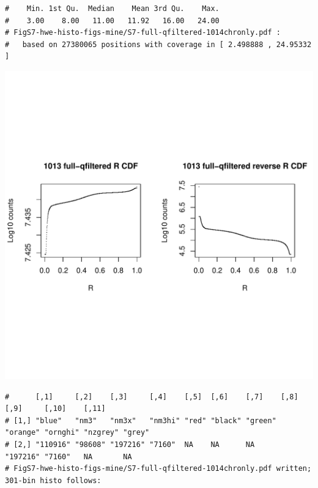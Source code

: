 \documentclass{article}\usepackage[]{graphicx}\usepackage[]{color}
\makeatletter
\def\maxwidth{ %
  \ifdim\Gin@nat@width>\linewidth
    \linewidth
  \else
    \Gin@nat@width
  \fi
}
\newenvironment{kframe}{%
 \def\at@end@of@kframe{}%
 \ifinner\ifhmode%
  \def\at@end@of@kframe{\end{minipage}}%
  \begin{minipage}{\columnwidth}%
 \fi\fi%
 \def\FrameCommand##1{\hskip\@totalleftmargin \hskip-\fboxsep
 \colorbox{shadecolor}{##1}\hskip-\fboxsep
     \hskip-\linewidth \hskip-\@totalleftmargin \hskip\columnwidth}%
 \MakeFramed {\advance\hsize-\width
   \@totalleftmargin\z@ \linewidth\hsize
   \@setminipage}}%
 {\par\unskip\endMakeFramed%
 \at@end@of@kframe}
\newenvironment{knitrout}{}{} %
\makeatother
\begin{document}
\begin{knitrout}
\begin{kframe}
\begin{verbatim}
#    Min. 1st Qu.  Median    Mean 3rd Qu.    Max. 
#    3.00    8.00   11.00   11.92   16.00   24.00 
# FigS7-hwe-histo-figs-mine/S7-full-qfiltered-1014chronly.pdf :
#   based on 27380065 positions with coverage in [ 2.498888 , 24.95332 ]
\end{verbatim}
\end{kframe}
\includegraphics[width=\maxwidth]{FigS7-hwe-histo-figs-knitr/unnamed-chunk-10-34} 
\begin{kframe}\begin{verbatim}
#      [,1]     [,2]    [,3]     [,4]    [,5]  [,6]    [,7]    [,8]     [,9]     [,10]    [,11] 
# [1,] "blue"   "nm3"   "nm3x"   "nm3hi" "red" "black" "green" "orange" "ornghi" "nzgrey" "grey"
# [2,] "110916" "98608" "197216" "7160"  NA    NA      NA      "197216" "7160"   NA       NA    
# FigS7-hwe-histo-figs-mine/S7-full-qfiltered-1014chronly.pdf written; 301-bin histo follows:
\end{verbatim}
\end{kframe}

\end{knitrout}
\end{document}
